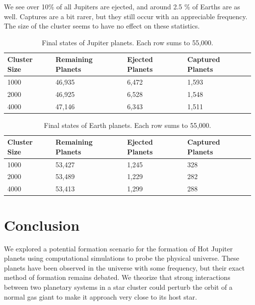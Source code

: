 \documentclass[12pt]{article}
\begin{document}
    We see over 10\% of all Jupiters are ejected, and around 2.5 \% of Earths are
    as well. Captures are a bit rarer, but they still occur with an appreciable
    frequency. The size of the cluster seems to have no effect on these statistics.

    \begin{table}[H]
        \centering
        \caption{Final states of Jupiter planets. Each row sums to 55,000.}
        \vspace{0.2in}
        \begin{tabular}{|llll|}
            \hline
            \textbf{Cluster Size} & \textbf{Remaining Planets} & \textbf{Ejected Planets} & \textbf{Captured Planets} \\
            \hline
            1000 & 46,935 & 6,472 & 1,593 \\
            2000 & 46,925 & 6,528 & 1,548 \\
            4000 & 47,146 & 6,343 & 1,511 \\
            \hline
        \end{tabular}
    \end{table}

    \begin{table}[H]
        \centering
        \caption{Final states of Earth planets. Each row sums to 55,000.}
        \vspace{0.2in}
        \begin{tabular}{|llll|}
            \hline
            \textbf{Cluster Size} & \textbf{Remaining Planets} & \textbf{Ejected Planets} & \textbf{Captured Planets} \\
            \hline
            1000 & 53,427 & 1,245 & 328 \\
            2000 & 53,489 & 1,229 & 282 \\
            4000 & 53,413 & 1,299 & 288 \\
            \hline
        \end{tabular}
    \end{table}


\section{Conclusion}

We explored a potential formation scenario for the formation of Hot Jupiter
planets using computational simulations to probe the physical universe. 
These planets have been observed in the universe with some frequency,
but their exact method of formation remains debated. 
We theorize that strong interactions between two planetary systems in a star
cluster could perturb the orbit of a normal gas giant to make it approach very close to
its host star. 
\end{document}
